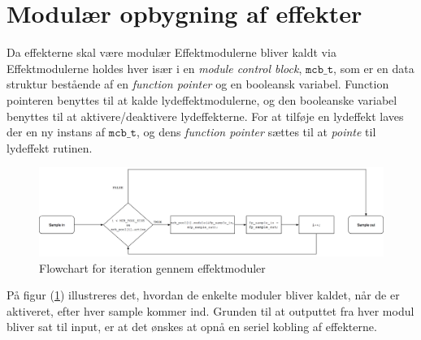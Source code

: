 \section{Modulær opbygning af effekter}
Da effekterne skal være modulær
Effektmodulerne bliver kaldt via 
Effektmodulerne holdes hver især i en \textit{module control block}, $\mathtt{mcb\_t}$,  som er en data struktur bestående af en \textit{function pointer} og en booleansk variabel.
Function pointeren benyttes til at kalde lydeffektmodulerne, og den booleanske variabel benyttes til at aktivere/deaktivere lydeffekterne.\newline
For at tilføje en lydeffekt laves der en ny instans af $\mathtt{mcb\_t}$, og dens \textit{function pointer} sættes til at \textit{pointe} til lydeffekt rutinen.\newline
\begin{figure}[!ht]
	\centering
	\includegraphics[width=\textwidth]{billeder/Flowchart_for_effektmoduler.png}
	\caption{Flowchart for iteration gennem effektmoduler}
	\label{fig:effektmoduler}
\end{figure}

På figur (\ref{fig:effektmoduler}) illustreres det, hvordan de enkelte moduler bliver kaldet, når de er aktiveret, efter hver sample kommer ind.
Grunden til at outputtet fra hver modul bliver sat til input, er at det ønskes at opnå en seriel kobling af effekterne.

